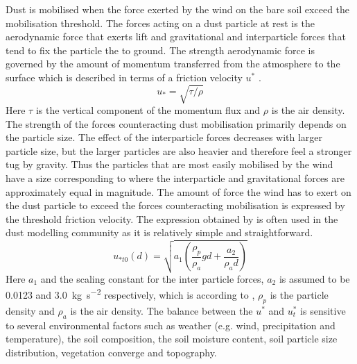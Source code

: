 Dust is mobilised when the force exerted by the wind on the bare soil exceed the mobilisation threshold. The forces acting on a dust particle at rest is the aerodynamic force that exerts lift and gravitational and interparticle forces that tend to fix the particle the to ground. 
The strength aerodynamic force is governed by the amount of momentum transferred from the atmosphere to the surface which is described in terms of a friction velocity $u^*$ \parencite{ShaoYaping2008PaMo}.
\begin{equation}
    u_* = \sqrt{\tau/\rho}
\end{equation}
Here $\tau$ is the vertical component of the momentum flux and $\rho$ is the air density. The strength of the forces counteracting dust mobilisation primarily depends on the particle size. The effect of the interparticle forces decreases with larger particle size, but the larger particles are also heavier and therefore feel a stronger tug by gravity. Thus the particles that are most easily mobilised by the wind have a size corresponding to where the interparticle and gravitational forces are approximately equal in magnitude.     
The amount of force the wind has to exert on the dust particle to exceed the forces counteracting mobilisation is expressed by the threshold friction velocity. The expression obtained by \textcite{shao2000simple} is often used in the dust modelling community as it is relatively simple and straightforward. 
\begin{equation}
    u_{*t0}(d) = \sqrt{a_1 \left(\frac{\rho_p}{\rho_a}gd+\frac{a_2}{\rho_ad}\right)} 
\end{equation}
Here $a_1$ and the scaling constant for the inter particle forces, $a_2$  is assumed to be 0.0123 and \SI{3.0}{\kg\per\s\squared} respectively, which is  
according to \textcite{shao2000simple}, $\rho_p$ is the particle density and $\rho_a$ is the air density. 
The balance between the $u^*$ and $u^*_t$ is sensitive to several environmental factors such as weather (e.g. wind, precipitation and temperature), the soil composition, the soil moisture content, soil particle size distribution, vegetation converge and topography.  
